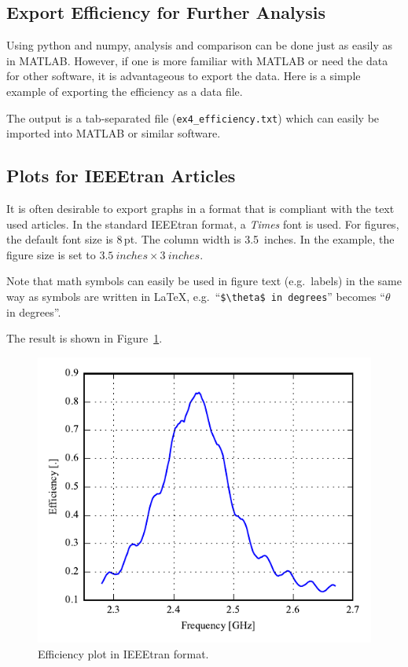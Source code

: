 \documentclass[10pt]{article}
\begin{document}
\clearpage
\subsection{Export Efficiency for Further Analysis}

Using python and numpy, analysis and comparison can be done just as easily as in MATLAB. However, if one is more familiar with MATLAB or need the data for other software, it is advantageous to export the data. Here is a simple example of exporting the efficiency as a data file.

The output is a tab-separated file (\texttt{ex4\_efficiency.txt}) which can easily be imported into MATLAB or similar software.


\clearpage
\subsection{Plots for IEEEtran Articles}
It is often desirable to export graphs in a format that is compliant with the text used articles. In the standard IEEEtran format, a \emph{Times} font is used. For figures, the default font size is 8\,pt. The column width is \SI{3.5}{inches}. In the example, the figure size is set to $\SI{3.5}{inches}\times \SI{3}{inches}$.

Note that math symbols can easily be used in figure text (e.g.\ labels) in the same way as symbols are written in \LaTeX, e.g.\ ``\verb|$\theta$ in degrees|'' becomes ``$\theta$ in degrees''.

The result is shown in Figure~\ref{fig:example5}.


\begin{figure}[htbp]
    \centering
    \includegraphics{examples/ex5_efficiency.pdf}
    \caption{Efficiency plot in IEEEtran format.}
    \label{fig:example5}
\end{figure}
\end{document}
